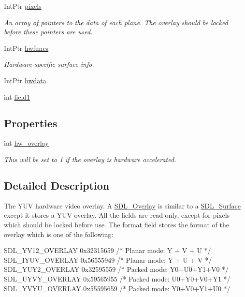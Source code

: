 \begin{DoxyCompactItemize}
IntPtr \hyperlink{struct_s_d_l___overlay_a78e601a5c563f20818d120c72a3213b1}{pixels}
\begin{DoxyCompactList}\small\item\em An array of pointers to the data of each plane. The overlay should be locked before these pointers are used. \item\end{DoxyCompactList}\item 
IntPtr \hyperlink{struct_s_d_l___overlay_aaeac08fb69a351324a87dc4af470e8eb}{hwfuncs}
\begin{DoxyCompactList}\small\item\em Hardware-\/specific surface info. \item\end{DoxyCompactList}\item 
IntPtr \hyperlink{struct_s_d_l___overlay_a4f88c41e139b1351bf8a0e47f1ea5423}{hwdata}
\item 
int \hyperlink{struct_s_d_l___overlay_a8b4fcc8ef6d876747e39c25631f4778a}{field1}
\end{DoxyCompactItemize}
\subsection*{Properties}
\begin{DoxyCompactItemize}
\item 
int \hyperlink{struct_s_d_l___overlay_a9bf02d4f3968124a14c2864cd8b992a5}{hw\_\-overlay}
\begin{DoxyCompactList}\small\item\em This will be set to 1 if the overlay is hardware accelerated. \item\end{DoxyCompactList}\end{DoxyCompactItemize}


\subsection{Detailed Description}
The YUV hardware video overlay. A \hyperlink{struct_s_d_l___overlay}{SDL\_\-Overlay} is similar to a \hyperlink{struct_s_d_l___surface}{SDL\_\-Surface} except it stores a YUV overlay. All the fields are read only, except for pixels which should be locked before use. The format field stores the format of the overlay which is one of the following: 
\begin{DoxyCode}
            SDL_YV12_OVERLAY  0x32315659  /* Planar mode: Y + V + U */
            SDL_IYUV_OVERLAY  0x56555949  /* Planar mode: Y + U + V */
            SDL_YUY2_OVERLAY  0x32595559  /* Packed mode: Y0+U0+Y1+V0 */
            SDL_UYVY_OVERLAY  0x59565955  /* Packed mode: U0+Y0+V0+Y1 */
            SDL_YVYU_OVERLAY  0x55595659  /* Packed mode: Y0+V0+Y1+U0 */
\end{DoxyCode}


